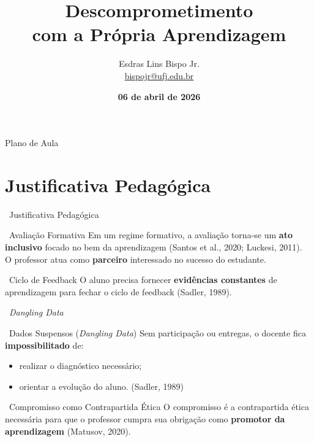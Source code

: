\documentclass[xcolor=dvipsnames,table]{beamer}
\title{Descomprometimento \\com a Própria Aprendizagem}
\author{
  Esdras Lins Bispo Jr. \\ \url{bispojr@ufj.edu.br}
}
\institute{
  Tópicos em Informática e Educação \\ Bacharelado em Ciência da Computação}
\date{\textbf{06 de abril de 2026}}
\begin{document}
  \begin{frame}
    \titlepage
  \end{frame}


  \begin{frame}{Plano de Aula}
    \tableofcontents
  \end{frame}

  \section{Justificativa Pedagógica}

  \begin{frame}{\faBook\ Justificativa Pedagógica}
    \begin{block}{\faCheckCircle\ Avaliação Formativa}
      Em um regime formativo, a avaliação torna-se um \textbf{ato inclusivo} focado no bem da
      aprendizagem (Santos et al., 2020; Luckesi, 2011).\\[4pt]
      O professor atua como \textbf{parceiro} interessado no sucesso do estudante.
    \end{block}
    \pause
    \begin{block}{\faRedoAlt\ Ciclo de Feedback}
      O aluno precisa fornecer \textbf{evidências constantes} de aprendizagem para fechar o ciclo
      de feedback (Sadler, 1989).
    \end{block}
  \end{frame}

  \begin{frame}{\faExclamationTriangle\ \textit{Dangling Data}}
    \begin{alertblock}{\faBan\ Dados Suspensos (\textit{Dangling Data})}
      Sem participação ou entregas, o docente fica \textbf{impossibilitado} de:
      \begin{itemize}
        \item[\faSearch] realizar o diagnóstico necessário;
        \item[\faSitemap] orientar a evolução do aluno. \small (Sadler, 1989)
      \end{itemize}
    \end{alertblock}
    \pause
    \begin{exampleblock}{\faHandshake\ Compromisso como Contrapartida Ética}
      O compromisso é a contrapartida ética necessária para que o professor cumpra sua obrigação
      como \textbf{promotor da aprendizagem} (Matusov, 2020).
    \end{exampleblock}
  \end{frame}
\end{document}
